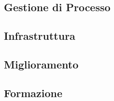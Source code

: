 \subsection{Gestione di Processo}
\subsection{Infrastruttura}
\subsection{Miglioramento}
\subsection{Formazione}